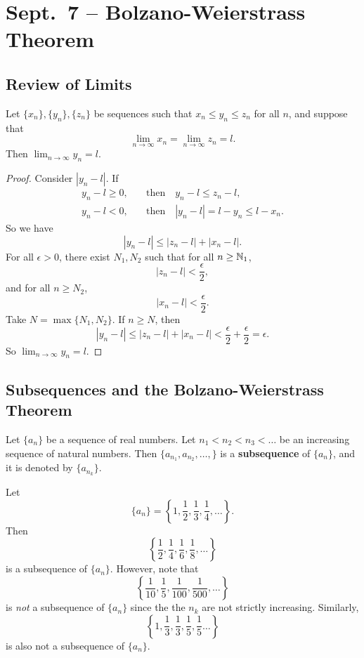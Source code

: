 \chapter{Sept.~7 -- Bolzano-Weierstrass Theorem}

\section{Review of Limits}

\begin{theorem}
  Let $\{x_n\}, \{y_n\}, \{z_n\}$ be sequences such
  that $x_n \le y_n \le z_n$ for all $n$, and suppose that
  \[\lim_{n \to \infty} x_n = \lim_{n \to \infty} z_n = l.\]
  Then $\lim_{n \to \infty} y_n = l$.
\end{theorem}

\begin{proof}
  Consider $|y_n - l|$.
  If
  \begin{align*}
    y_n - l \ge 0, &\quad \text{then} \quad y_n - l \le z_n - l, \\
    y_n - l < 0, &\quad \text{then} \quad |y_n - l| = l - y_n \le l - x_n.
  \end{align*}
  So we have
  \[
  |y_n - l| \le |z_n - l| + |x_n - l|
  .\]
  For all $\epsilon > 0$, there exist $N_1, N_2$ such that
  for all $n \ge \mathbb{N}_1$,
  \[
  |z_n - l| < \frac{\epsilon}{2},
  \]
  and for all $n \ge N_2$, \[
  |x_n - l| < \frac{\epsilon}{2}
  .\]
  Take $N = \max\{N_1, N_2\}$. If $n \ge N$, then
  \[
  |y_n - l| \le |z_n - l| + |x_n - l| <
  \frac{\epsilon}{2} + \frac{\epsilon}{2} = \epsilon
  .\]
  So $\lim_{n \to \infty} y_n = l$.
\end{proof}

\section{Subsequences and the Bolzano-Weierstrass Theorem}
\begin{definition}
  Let $\{a_n\}$ be a sequence of real numbers.
  Let $n_1 < n_2 < n_3 < \dots$ be an increasing sequence of
  natural numbers. Then $\{a_{n_1}, a_{n_2}, \dots, \}$
  is a \textbf{subsequence} of $\{a_n\}$, and it is
  denoted by $\{a_{n_k}\}$.
\end{definition}

\begin{example}
  Let
  \[\{a_n\} = \left\{1, \frac{1}{2}, \frac{1}{3}, \frac{1}{4}, \dots\right\}.\]
  Then 
  \[\left\{\frac{1}{2}, \frac{1}{4}, \frac{1}{6}, \frac{1}{8}, \dots\right\}\]
  is a subsequence of $\{a_n\}$.
  However, note that
  \[\left\{\frac{1}{10}, \frac{1}{5}, \frac{1}{100}, \frac{1}{500}, \dots\right\}\]
  is \textit{not} a subsequence of $\{a_n\}$ since the
  the $n_k$ are not strictly increasing. Similarly,
  \[\left\{1, \frac{1}{3}, \frac{1}{3}, \frac{1}{5}, \frac{1}{5} \dots\right\}\]
  is also not a subsequence of $\{a_n\}$.
\end{example}

